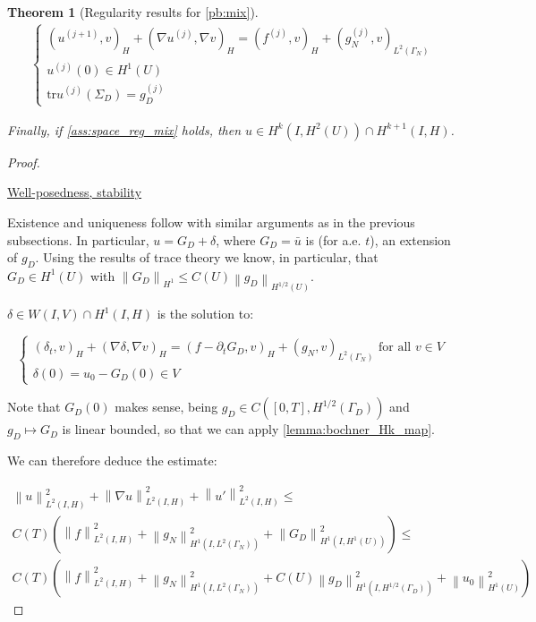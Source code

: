 \documentclass[english,a4paper,9pt,oneside]{scrbook}	%
\theoremstyle{break}
\newtheorem{thm}[equation]{Theorem}
\newenvironment{mproof}[1][\proofname]{%
  \begin{proof}[#1]$ $\par\nobreak\ignorespaces
}{%
  \end{proof}
}
\renewcommand*{\proofname}{Proof}
\theoremstyle{remark}
\newcommand{\norm}[1]{\left\lVert#1\right\rVert}
\newcommand{\tr}{\text{tr}}
\begin{document}
\begin{appendices}
\begin{thm}[Regularity results for \cref{pb:mix}]
\begin{align*}
	\left\{\begin{matrix}
(u^{(j+1)},v)_H + (\nabla u^{(j)}, \nabla v)_H = ( f^{(j)}, v)_H + (g_N^{(j)}, v)_{L^2(\Gamma_N)} \\
u^{(j)}(0)  \in H^1(U) \\
\tr u^{(j)}(\Sigma_D) = g_D^{(j)}
\end{matrix}\right.
\end{align*}


Finally, if \cref{ass:space_reg_mix} holds, then $u \in H^{k}(I,H^2(U)) \cap H^{k+1}(I,H)$.

\end{thm}

\begin{mproof}

\underline{Well-posedness, stability}

Existence and uniqueness follow with similar arguments as in the previous subsections.
In particular, $u=G_D + \delta$, where $G_D=\bar{u}$ is (for a.e. $t$), an extension of $g_D$. Using the results of trace theory we know, in particular, that $G_D \in H^1(U)$ with $\norm{G_D}_{H^1}\leq C(U) \norm{g_D}_{H^{1/2}(U)}$.

$\delta \in W(I,V) \cap H^1(I,H)$ is the solution to:

$$
\left\{\begin{matrix}
(\delta_t,v)_H + (\nabla \delta, \nabla v)_H = (f - \partial_t G_D,v)_H + (g_N,v)_{L^2(\Gamma_N)} \text{ for all } v \in V\\ 
\delta(0) = u_0 - G_D(0) \in V
\end{matrix}\right.
$$

Note that $G_D(0)$ makes sense, being $g_D \in C([0,T], H^{1/2}(\Gamma_D))$ and $g_D \mapsto G_D$ is linear bounded, so that we can apply \cref{lemma:bochner_Hk_map}.

We can therefore deduce the estimate:

\begin{align*}
	\norm{u}^2_{L^2(I,H)}+\norm{\nabla u}^2_{L^2(I,H)} + \norm{u'}^2_{L^2(I,H)} \leq \\
	C(T)\left (  \norm{f}_{L^2(I,H)}^2 +  \norm{g_N}^2_{H^1(I,L^2(\Gamma_N))}  + \norm{G_D}^2_{H^1(I,H^1(U))}\right )  \leq \\
	C(T)\left (  \norm{f}_{L^2(I,H)}^2 +  \norm{g_N}^2_{H^1(I,L^2(\Gamma_N))} + C(U) \norm{g_D}^2_{H^1(I,H^{1/2}(\Gamma_D))} + \norm{u_0}^2_{H^1(U)}\right )
\end{align*}


\end{mproof}
\end{appendices}
\end{document}
